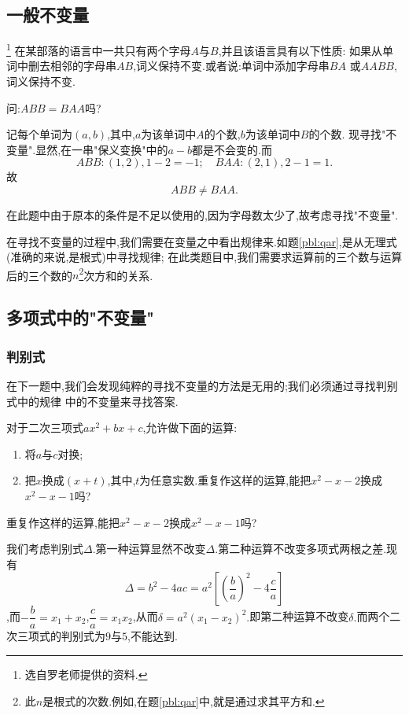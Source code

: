 \subsection{一般不变量}
\begin{problem}\footnote{选自罗老师提供的资料.}
    在某部落的语言中一共只有两个字母$A$与$B$,并且该语言具有以下性质:
    如果从单词中删去相邻的字母串$AB$,词义保持不变.或者说:单词中添加字母串$BA$
    或$AABB$,词义保持不变.

    问:$ABB=BAA$吗?
\end{problem}
\begin{solution}
    记每个单词为$(a,b)$,其中,$a$为该单词中$A$的个数,$b$为该单词中$B$的个数.
    现寻找"不变量".显然,在一串"保义变换"中的$a-b$都是不会变的.而$$ABB:(1,2),1-2=-1;\quad BAA:(2,1),2-1=1.$$
    故$$ABB\neq BAA.$$
\end{solution}
在此题中由于原本的条件是不足以使用的,因为字母数太少了,故考虑寻找"不变量".

在寻找不变量的过程中,我们需要在变量之中看出规律来.如题\ref{pbl:qar},是从无理式(准确的来说,是根式)中寻找规律;
在此类题目中,我们需要求运算前的三个数与运算后的三个数的$n$\footnote{此$n$是根式的次数.例如,在题\ref{pbl:qar}中,就是通过求其平方和.}次方和的关系.
\subsection{多项式中的"不变量"}
\subsubsection{判别式}
在下一题中,我们会发现纯粹的寻找不变量的方法是无用的;我们必须通过寻找判别式中的规律
中的不变量来寻找答案.
\begin{problem}
    对于二次三项式$ax^2+bx+c$,允许做下面的运算:
    \begin{enumerate}
        \item 将$a$与$c$对换;
        \item 把$x$换成$(x+t)$,其中,$t$为任意实数.重复作这样的运算,能把$x^2-x-2$换成$x^2-x-1$吗?
    \end{enumerate}
    重复作这样的运算,能把$x^2-x-2$换成$x^2-x-1$吗?
\end{problem}
\begin{solution}
    我们考虑判别式$\Delta$.第一种运算显然不改变$\Delta$.第二种运算不改变多项式两根之差.现有$$\Delta=b^2-4ac=a^2\left[\left(\dfrac{b}{a}\right)^2-4\dfrac{c}{a}\right]$$,而$-\dfrac{b}{a}=x
    _1+x_2$,$\dfrac{c}{a}=x_1x_2$,从而$\delta=a^2\left( x_1-x_2 \right)^2.$即第二种运算不改变$\delta.$而两个二次三项式的判别式为$9$与$5$,不能达到.
\end{solution}
